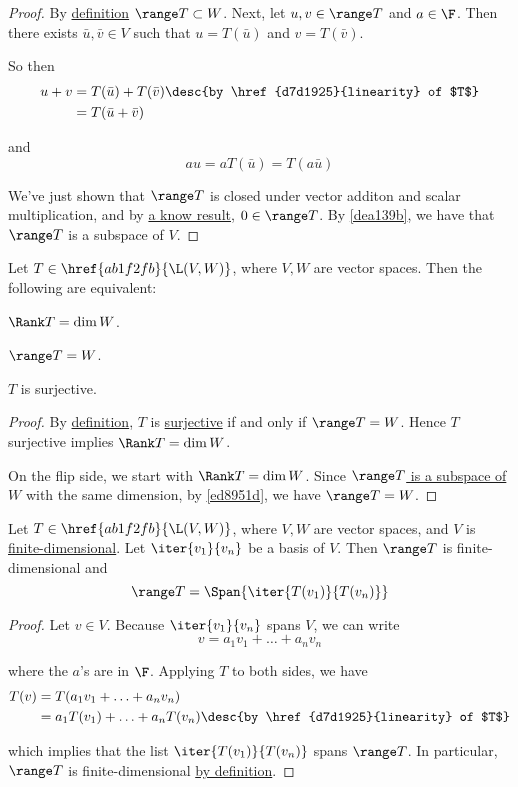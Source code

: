 \begin{proof}
  By \href{a3ef003}{definition} $\range T\subset W$. Next, let $u,v\in\range
  T$ and $a\in\F$. Then there exists $\bar u,\bar v\in V$ such that $u=T(\bar
  u)$ and $v=T(\bar v)$.

  So then
  \begin{align*}
    u+v &=T(\bar u)+T(\bar v)\desc{by \href{d7d1925}{linearity} of $T$} \\
        &=T(\bar u+\bar v)
  \end{align*}

  and
  $$
    au=aT(\bar u)=T(a\bar u)
  $$

  We've just shown that $\range T$ is closed under vector additon and scalar
  multiplication, and by \href{c5eb127}{a know result}, $0\in\range T$. By
  \autoref{dea139b}, we have that $\range T$ is a subspace of $V$.
\end{proof}

\label{a41ddec}

Let $T\in\href{ab1f2fb}{\L(V,W)}$, where $V,W$ are vector spaces. Then the
following are equivalent:
\begin{enumerati}
  \item $\Rank T=\dim W$.
  \item $\range T=W$.
  \item $T$ is surjective.
\end{enumerati}

\begin{proof}
  By \href{a3ef003}{definition}, $T$ is \href{bd75843}{surjective} if and only if
  $\range T=W$. Hence $T$ surjective implies $\Rank T=\dim W$.

  On the flip side, we start with $\Rank T=\dim W$. Since
  \href{d0afc28}{$\range T$ is a subspace of $W$} with the same dimension, by
  \autoref{ed8951d}, we have $\range T=W$.
\end{proof}

\label{d91179c}

Let $T\in\href{ab1f2fb}{\L(V,W)}$, where $V,W$ are vector spaces, and $V$ is
\href{c4cd6dd}{finite-dimensional}. Let $\iter{v_1}{v_n}$ be a basis of $V$.
Then $\range T$ is finite-dimensional and
$$
  \range T=\Span\{\iter{T(v_1)}{T(v_n)}\}
$$

\begin{proof}
  Let $v\in V$. Because $\iter{v_1}{v_n}$ spans $V$, we can write
  $$
    v=a_1v_1+\ldots+a_nv_n
  $$

  where the $a$'s are in $\F$. Applying $T$ to both sides, we have
  \begin{align*}
    T(v) &=T(a_1v_1+\ldots+a_nv_n)                                              \\
         &=a_1T(v_1)+\ldots+a_nT(v_n)\desc{by \href{d7d1925}{linearity} of $T$}
  \end{align*}

  which implies that the list $\iter{T(v_1)}{T(v_n)}$ spans $\range T$. In
  particular, $\range T$ is finite-dimensional \href{c4cd6dd}{by definition}.
\end{proof}

